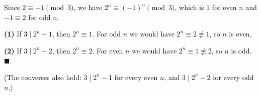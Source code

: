 Since $2\equiv-1\pmod3$, we have $2^n\equiv(-1)^n\pmod 3$, which is $1$ for even $n$ and $-1\equiv2$ for odd $n$.

\textbf{(1)} If $3\mid2^n-1$, then $2^n\equiv1$. For odd $n$ we would have $2^n\equiv2\not\equiv1$, so $n$ is even.

\textbf{(2)} If $3\mid2^n-2$, then $2^n\equiv2$. For even $n$ we would have $2^n\equiv1\not\equiv2$, so $n$ is odd. $\blacksquare$

(The converses also hold: $3\mid2^n-1$ for every even $n$, and $3\mid2^n-2$ for every odd $n$.)
